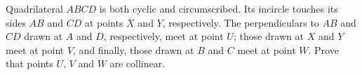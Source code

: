 Quadrilateral $ABCD$ is both cyclic and circumscribed. Its incircle touches its sides $AB$ and $CD$ at points $X$ and $Y$,  respectively. The perpendiculars to $AB$ and $CD$ drawn at $A$ and $D$,  respectively, meet at point $U$; those drawn at $X$ and $Y$ meet at point $V$,  and finally, those drawn at $B$ and $C$ meet at point $W$. Prove that points $U$,  $V$ and $W$ are collinear.